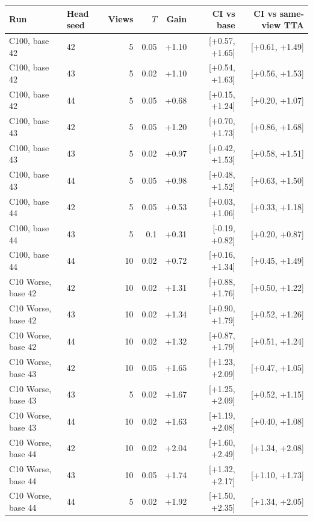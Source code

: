 \begin{tabular}{llrrrrr}
\toprule
Run & Head seed & Views & $T$ & Gain & CI vs base & CI vs same-view TTA \\
\midrule
C100, base 42 & 42 & 5 & 0.05 & +1.10 & [+0.57, +1.65] & [+0.61, +1.49] \\
C100, base 42 & 43 & 5 & 0.02 & +1.10 & [+0.54, +1.63] & [+0.56, +1.53] \\
C100, base 42 & 44 & 5 & 0.05 & +0.68 & [+0.15, +1.24] & [+0.20, +1.07] \\
C100, base 43 & 42 & 5 & 0.05 & +1.20 & [+0.70, +1.73] & [+0.86, +1.68] \\
C100, base 43 & 43 & 5 & 0.02 & +0.97 & [+0.42, +1.53] & [+0.58, +1.51] \\
C100, base 43 & 44 & 5 & 0.05 & +0.98 & [+0.48, +1.52] & [+0.63, +1.50] \\
C100, base 44 & 42 & 5 & 0.05 & +0.53 & [+0.03, +1.06] & [+0.33, +1.18] \\
C100, base 44 & 43 & 5 & 0.1 & +0.31 & [-0.19, +0.82] & [+0.20, +0.87] \\
C100, base 44 & 44 & 10 & 0.02 & +0.72 & [+0.16, +1.34] & [+0.45, +1.49] \\
C10 Worse, base 42 & 42 & 10 & 0.02 & +1.31 & [+0.88, +1.76] & [+0.50, +1.22] \\
C10 Worse, base 42 & 43 & 10 & 0.02 & +1.34 & [+0.90, +1.79] & [+0.52, +1.26] \\
C10 Worse, base 42 & 44 & 10 & 0.02 & +1.32 & [+0.87, +1.79] & [+0.51, +1.24] \\
C10 Worse, base 43 & 42 & 10 & 0.05 & +1.65 & [+1.23, +2.09] & [+0.47, +1.05] \\
C10 Worse, base 43 & 43 & 5 & 0.02 & +1.67 & [+1.25, +2.09] & [+0.52, +1.15] \\
C10 Worse, base 43 & 44 & 10 & 0.02 & +1.63 & [+1.19, +2.08] & [+0.40, +1.08] \\
C10 Worse, base 44 & 42 & 10 & 0.02 & +2.04 & [+1.60, +2.49] & [+1.34, +2.08] \\
C10 Worse, base 44 & 43 & 10 & 0.05 & +1.74 & [+1.32, +2.17] & [+1.10, +1.73] \\
C10 Worse, base 44 & 44 & 5 & 0.02 & +1.92 & [+1.50, +2.35] & [+1.34, +2.05] \\
\bottomrule
\end{tabular}
